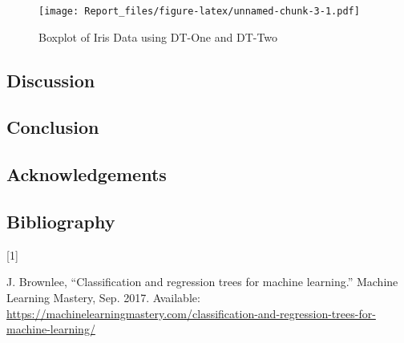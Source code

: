 \documentclass[
]{article}
\newlength{\cslhangindent}
\newlength{\csllabelwidth}
\newenvironment{CSLReferences}[2] %
 {\begin{list}{}{%
  \setlength{\itemindent}{0pt}
  \setlength{\leftmargin}{0pt}
  \setlength{\parsep}{0pt}
  \ifodd #1
   \setlength{\leftmargin}{\cslhangindent}
   \setlength{\itemindent}{-1\cslhangindent}
  \fi
  \setlength{\itemsep}{#2\baselineskip}}}
 {\end{list}}
\newcommand{\CSLLeftMargin}[1]{\parbox[t]{\csllabelwidth}{\strut#1\strut}}
\newcommand{\CSLRightInline}[1]{\parbox[t]{\linewidth - \csllabelwidth}{\strut#1\strut}}
\begin{document}
\begin{figure}
\centering
\texttt{[image: Report\_files/figure-latex/unnamed-chunk-3-1.pdf]}
\caption{Boxplot of Iris Data using DT-One and DT-Two}
\end{figure}

\subsection{Discussion}\label{discussion}

\subsection{Conclusion}\label{conclusion}

\subsection{Acknowledgements}\label{acknowledgements}

\subsection*{Bibliography}\label{bibliography}

\label{refs}
\begin{CSLReferences}{0}{0}
\CSLLeftMargin{{[}1{]} }%
\CSLRightInline{J. Brownlee, {``Classification and regression trees for
machine learning.''} Machine Learning Mastery, Sep. 2017. Available:
\url{https://machinelearningmastery.com/classification-and-regression-trees-for-machine-learning/}}

\end{CSLReferences}
\end{document}
